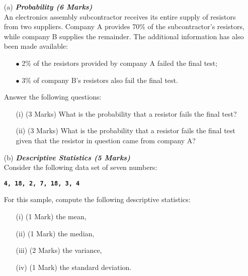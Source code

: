 \documentclass[a4paper,12pt]{article}
\begin{document}
\begin{itemize}
\item[(a)]  \textbf{\textit{Probability (6 Marks)}}\\
An electronics assembly subcontractor receives its entire supply of resistors from two suppliers. Company A provides 70\% of the subcontractor's resistors, while company B supplies the remainder. The additional information has also been made available:

\begin{itemize}
\item[{$\bullet$}] 2\% of the resistors provided by company A failed the final test;
\item[{$\bullet$}] 3\% of company B's resistors also fail the final test.
\end{itemize}
\noindent Answer the following questions:
\begin{itemize}
\item[(i)](3 Marks) What is the probability that a resistor fails the final test?
\item[(ii)](3 Marks)  What is the probability that a resistor fails the final test given that the resistor in question came from company A?
\end{itemize}

\item[(b)] \textbf{\textit{Descriptive Statistics (5 Marks)}}\\
Consider the following data set of seven numbers:

\begin{center}
\textbf{\texttt{4, 18,  2,  7, 18,  3,  4 }}
\end{center}

\noindent For this sample, compute the following descriptive statistics:
\begin{itemize}
\item[(i)] (1 Mark) the mean,
\item[(ii)] (1 Mark) the median,
\item[(iii)] (2 Marks) the variance,
\item[(iv)] (1 Mark) the standard deviation.
\end{itemize}
\end{itemize}
\end{document}
